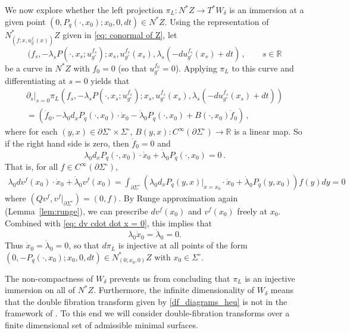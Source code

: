 \documentclass[11pt]{amsart}
\theoremstyle{definition}
\numberwithin{equation}{section}
\newcommand{\p}{\partial}
\begin{document}
We now explore whether the left projection $\pi_L : N^*Z \to T^* W_\delta$ is an immersion at a given point $(0, P_q(\cdot, x_0); x_0, 0,  dt) \in N^*Z$. Using the representation of $N^*_{(f; x, u_{g^\circ}^f(x))}Z$ given in \eqref{eq: conormal of Z}, let 
\[
	(f_s,  -\lambda_s P(\cdot, x_s; u^{f_{s}}_{g^\circ}); x_s, u^{f_s}_{g^\circ}(x_s), \lambda_s(-du^{f_s}_{g^\circ}(x_s)+ dt)\,,\qquad s\in \mathbb R
\]
be a curve in $N^*Z$ with $f_0 = 0$ (so that $u^{f_0}_{g^\circ}=0$). Applying $\pi_L$ to this curve and differentiating at $s=0$ yields that
\begin{multline*}
	\partial_s\vert_{s= 0}\pi_L(f_s,  -\lambda_s P(\cdot, x_s; u^{f_{s}}_{g^\circ}); x_s, u^{f_s}_{g^\circ}(x_s), \lambda_s(-du^{f_s}_{g^\circ}(x_s)+ dt)) \\
     = (\dot f_0, -\lambda_0 d_x P_q(\cdot, x_0) \cdot \dot x_0 -\dot{\lambda}_0 P_q(\cdot,x_0) + B(\cdot, x_0) \dot f_0 )\,,
\end{multline*}
where for each $(y,x)\in \partial \Sigma^\circ \times \Sigma^\circ$, $B(y,x)\colon C^\infty(\partial \Sigma^\circ) \to \mathbb R$ is a linear map. So if the right hand side is zero, then $\dot{f}_0 = 0$ and 
\[
	\lambda_0 d_xP_q(\cdot, x_0) \cdot \dot x_0 + \dot{\lambda}_0 P_q(\cdot,x_0) = 0\,.
\]
That is, for all $f\in C^\infty(\partial \Sigma^\circ)$, 
\begin{eqnarray} \label{eq: dv cdot dot x = 0}
\lambda_0 d v^f(x_0) \cdot \dot x_0 + \dot{\lambda}_0 v^f(x_0) =\int_{\partial \Sigma^\circ} (\lambda_0 d_xP_q(y, x)\vert_{x=x_0} \cdot \dot{x}_0 + \dot{\lambda}_0 P_q(y,x_0))f(y)dy = 0
\end{eqnarray}
 where $(Q v^f,v^f\vert_{\p\Sigma^\circ})=(0,f)$. %
 By Runge approximation again (Lemma~\ref{lem:runge}), we can prescribe $dv^f(x_0)$ and $v^f(x_0)$ freely at $x_0$. Combined with \eqref{eq: dv cdot dot x = 0}, this implies that 
 \[
    \lambda_0 \dot{x}_0 = \dot{\lambda}_0 = 0.
 \]
Thus $\dot{x}_0 = \dot{\lambda}_0 = 0$, so that $d\pi_L$ is injective at all points of the form $(0, -P_q(\cdot, x_0); x_0, 0, dt)\in N^*_{(0; x_0, 0)} Z$ with $x_0\in \Sigma^\circ$.

The non-compactness of $W_\delta$ prevents us from concluding that $\pi_L$ is an injective immersion on all of $N^*Z$. Furthermore, the infinite dimensionality of $W_\delta$ means that the double fibration transform given by \eqref{df_diagrams_heu} is not in the framework of \cite{MST}. To this end we will consider double-fibration transforms over a finite dimensional set of admissible minimal surfaces.
\end{document}

